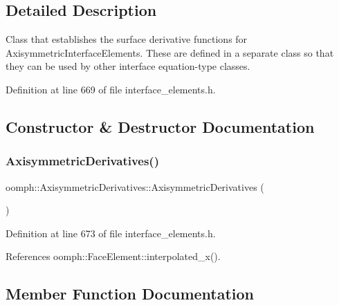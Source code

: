 \subsection{Detailed Description}
Class that establishes the surface derivative functions for Axisymmetric\+Interface\+Elements. These are defined in a separate class so that they can be used by other interface equation-\/type classes. 

Definition at line 669 of file interface\+\_\+elements.\+h.



\subsection{Constructor \& Destructor Documentation}
\mbox{\label{classoomph_1_1AxisymmetricDerivatives_a91b259ef45c7563b05bf79de4b0fe4bf}} 
\subsubsection{\texorpdfstring{Axisymmetric\+Derivatives()}{AxisymmetricDerivatives()}}
{\footnotesize\ttfamily oomph\+::\+Axisymmetric\+Derivatives\+::\+Axisymmetric\+Derivatives (\begin{DoxyParamCaption}{ }\end{DoxyParamCaption})\hspace{0.3cm}{\ttfamily [inline]}}



Definition at line 673 of file interface\+\_\+elements.\+h.



References oomph\+::\+Face\+Element\+::interpolated\+\_\+x().



\subsection{Member Function Documentation}
\mbox{\label{classoomph_1_1AxisymmetricDerivatives_a306ea6b57d09d57e87e8d74a13c2f828}} 
